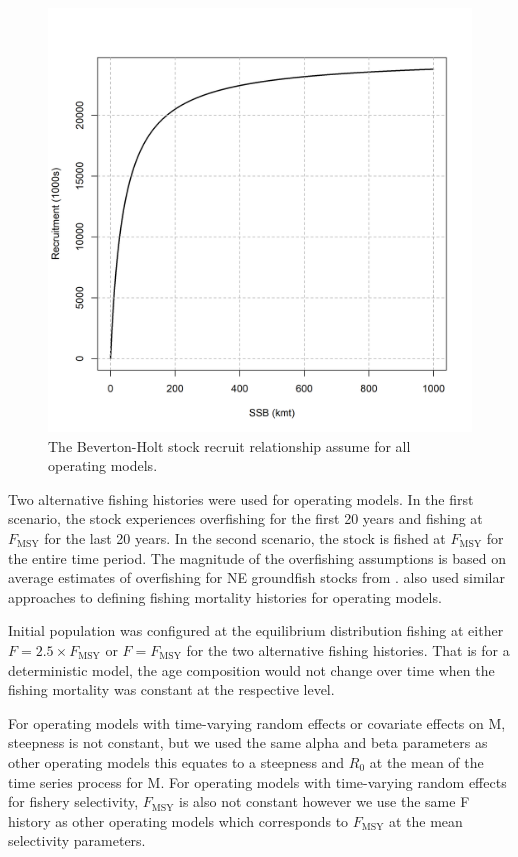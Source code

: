\documentclass[
  12pt,
]{article}
\newcommand{\Fmsy}{\ensuremath{F_{\text{MSY}}}\xspace}
\begin{document}
\begin{figure}
\caption{The Beverton-Holt stock recruit relationship assume for all operating models.}\label{om_sr}
\begin{center}
\includegraphics[width = \textwidth]{om_sr.png}
\end{center}
\end{figure}

Two alternative fishing histories were used for operating models. In the
first scenario, the stock experiences overfishing for the first 20 years
and fishing at \Fmsy for the last 20 years. In the second scenario, the
stock is fished at \Fmsy for the entire time period. The magnitude of
the overfishing assumptions is based on average estimates of overfishing
for NE groundfish stocks from \citet{wiedenmannetal19}.
 also used similar approaches to defining fishing
mortality histories for operating models.

Initial population was configured at the equilibrium distribution
fishing at either \(F = 2.5\times \Fmsy\) or \(F = \Fmsy\) for the two
alternative fishing histories. That is for a deterministic model, the
age composition would not change over time when the fishing mortality
was constant at the respective level.

For operating models with time-varying random effects or covariate
effects on M, steepness is not constant, but we used the same alpha and
beta parameters as other operating models this equates to a steepness
and \(R_0\) at the mean of the time series process for M. For operating
models with time-varying random effects for fishery selectivity,
\Fmsy is also not constant however we use the same F history as other
operating models which corresponds to \Fmsy at the mean selectivity
parameters.
\end{document}
